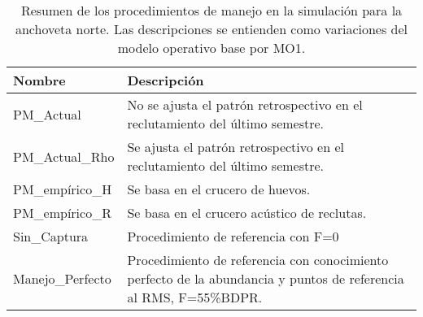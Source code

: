 \begin{table}[H]
    \centering
    \caption{Resumen de los procedimientos de manejo en la simulación para la anchoveta norte. Las descripciones se entienden como variaciones del modelo operativo base por MO1.}
    \label{tab:tabla3}
    \begin{tabular}{|p{3.5cm}|p{10cm}|}
        \hline
        \textbf{Nombre} & \textbf{Descripción} \\
        \hline
        PM\_Actual & No se ajusta el patrón retrospectivo en el reclutamiento del último semestre.\\
        \hline
        PM\_Actual\_Rho & Se ajusta el patrón retrospectivo en el reclutamiento del último semestre.\\
        \hline
        PM\_empírico\_H & Se basa en el crucero de huevos. \\
        \hline
        PM\_empírico\_R & Se basa en el crucero acústico de reclutas. \\
        \hline
        Sin\_Captura & Procedimiento de referencia con F=0 \\
        \hline
        Manejo\_Perfecto & Procedimiento de referencia con conocimiento perfecto de la abundancia y puntos de referencia al RMS, F=55\%BDPR.\\
        \hline
    \end{tabular}
\end{table}


